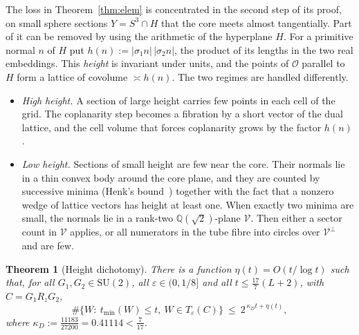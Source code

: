 \documentclass[aps,prx,twocolumn,superscriptaddress,nofootinbib,longbibliography]{revtex4-2}
\theoremstyle{plain}
\newtheorem{theorem}{Theorem}
\theoremstyle{definition}
\theoremstyle{remark}
\newcommand{\Q}{\mathbb{Q}}
\newcommand{\SU}{\mathrm{SU}(2)}
\begin{document}
The loss in Theorem~\ref{thm:elem} is concentrated in the second step of its proof, on small sphere sections $Y=S^3\cap H$ that the core meets almost tangentially. Part of it can be removed by using the arithmetic of the hyperplane $H$. For a primitive normal $n$ of $H$ put $h(n):=|\sigma_1n|\,|\sigma_2n|$, the product of its lengths in the two real embeddings. This \emph{height} is invariant under units, and the points of $\mathcal O$ parallel to $H$ form a lattice of covolume $\asymp h(n)$. The two regimes are handled differently.
\begin{itemize}
\item \emph{High height.} A section of large height carries few points in each cell of the grid. The coplanarity step becomes a fibration by a short vector of the dual lattice, and the cell volume that forces coplanarity grows by the factor $h(n)$.
\item \emph{Low height.} Sections of small height are few near the core. Their normals lie in a thin convex body around the core plane, and they are counted by successive minima (Henk's bound~\cite{Henk}) together with the fact that a nonzero wedge of lattice vectors has height at least one. When exactly two minima are small, the normals lie in a rank-two $\Q(\sqrt2)$-plane $\mathcal V$. Then either a sector count in $\mathcal V$ applies, or all numerators in the tube fibre into circles over $\mathcal V^\perp$ and are few.
\end{itemize}

\begin{theorem}[Height dichotomy]\label{thm:dioph}
There is a function $\eta(t)=O(t/\log t)$ such that, for all $G_1,G_2\in\SU$, all $\varepsilon\in(0,1/8]$ and all $t\le\tfrac{17}7(L+2)$, with $C=G_1R_zG_2$,
\begin{equation}\label{eq:dioph}
\#\{W:\ t_{\min}(W)\le t,\ W\in T_\varepsilon(C)\}\ \le\ 2^{\,\kappa_Dt+\eta(t)},
\end{equation}
where $\kappa_D:=\tfrac{11183}{27200}=0.41114<\tfrac7{17}$.
\end{theorem}
\end{document}
